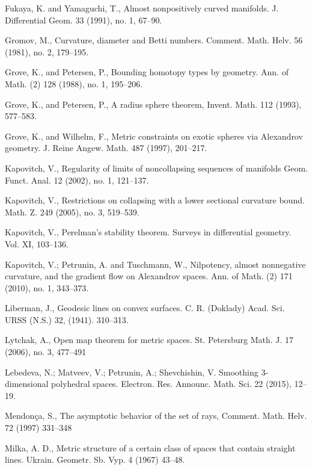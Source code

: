 \documentclass{article}
\begin{document}
\begin{thebibliography}{Bibliography}
Fukaya, K. and Yamaguchi, T., 
Almost nonpositively curved manifolds.  
J. Differential Geom.  33  (1991),  
no. 1, 67--90.

Gromov, M.,
Curvature, diameter and Betti numbers.
Comment. Math. Helv. 56 (1981), no. 2, 179--195. 

Grove, K., and Petersen, P.,
Bounding homotopy types by geometry.
Ann. of Math. (2) 128 (1988), no. 1, 195--206.

Grove, K., and Petersen, P., 
A radius sphere theorem,
Invent. Math. 112 (1993), 577--583.

Grove, K.,
and Wilhelm, F.,
Metric constraints on exotic spheres via Alexandrov geometry.  
J. Reine Angew. Math.  487  (1997), 201--217.

Kapovitch, V., Regularity of limits of noncollapsing sequences of manifolds Geom. Funct. Anal.  12  (2002),  no. 1, 121--137.

Kapovitch, V., 
Restrictions on
collapsing with a lower sectional curvature bound.  Math. Z.  249  (2005),  no.
3, 519--539.

Kapovitch, V., 
Perelman's stability theorem. 
Surveys in differential geometry. Vol. XI, 103--136.

 Kapovitch, V.; 
Petrunin, A. and 
Tuschmann, W., 
Nilpotency, almost nonnegative curvature, and the gradient flow on Alexandrov spaces. 
Ann. of Math. (2) 171 (2010), no. 1, 343--373. 

Liberman, J.,
Geodesic lines on convex surfaces.  C. R.
(Doklady) Acad. Sci. URSS (N.S.)  32,  
(1941). 
310--313.

Lytchak, A.,
Open map theorem for metric spaces.  
St. Petersburg Math. J.  17  (2006),  no. 3, 477--491 

Lebedeva, N.; 
Matveev, V.; 
Petrunin, A.; 
Shevchishin, V.
Smoothing 3-dimensional polyhedral spaces. 
Electron. Res. Announc. Math. Sci. 22 (2015), 12--19.

Mendon\c{c}a, S.,
The asymptotic behavior of the set of rays, 
Comment. Math. Helv. 72 (1997) 331--348

Milka, A. D., 
Metric structure of a certain class of spaces that contain straight lines.  Ukrain. Geometr. Sb. Vyp.  4  (1967) 43--48.


\end{thebibliography}
\end{document}
